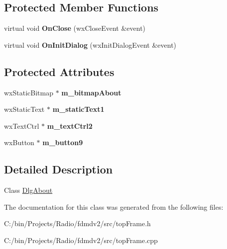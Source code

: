 \subsection*{Protected Member Functions}
\begin{DoxyCompactItemize}
\item 
\hypertarget{class_dlg_about_a3253b689497f4c6399d24c67ba78b51e}{virtual void {\bfseries On\-Close} (wx\-Close\-Event \&event)}\label{class_dlg_about_a3253b689497f4c6399d24c67ba78b51e}

\item 
\hypertarget{class_dlg_about_a442a568cf1b87a5d52a588b212f474f3}{virtual void {\bfseries On\-Init\-Dialog} (wx\-Init\-Dialog\-Event \&event)}\label{class_dlg_about_a442a568cf1b87a5d52a588b212f474f3}

\end{DoxyCompactItemize}
\subsection*{Protected Attributes}
\begin{DoxyCompactItemize}
\item 
\hypertarget{class_dlg_about_a7c406607035a55b453d7edcce9566c34}{wx\-Static\-Bitmap $\ast$ {\bfseries m\-\_\-bitmap\-About}}\label{class_dlg_about_a7c406607035a55b453d7edcce9566c34}

\item 
\hypertarget{class_dlg_about_adce6520e7385ff5ff3f032c4ed44bc14}{wx\-Static\-Text $\ast$ {\bfseries m\-\_\-static\-Text1}}\label{class_dlg_about_adce6520e7385ff5ff3f032c4ed44bc14}

\item 
\hypertarget{class_dlg_about_adc2a2d88de8cb15fcc4c9c943153df27}{wx\-Text\-Ctrl $\ast$ {\bfseries m\-\_\-text\-Ctrl2}}\label{class_dlg_about_adc2a2d88de8cb15fcc4c9c943153df27}

\item 
\hypertarget{class_dlg_about_a21c9c302df2e7f154ff410c732e6846f}{wx\-Button $\ast$ {\bfseries m\-\_\-button9}}\label{class_dlg_about_a21c9c302df2e7f154ff410c732e6846f}

\end{DoxyCompactItemize}


\subsection{Detailed Description}
Class \hyperlink{class_dlg_about}{Dlg\-About} 

The documentation for this class was generated from the following files\-:\begin{DoxyCompactItemize}
\item 
C\-:/bin/\-Projects/\-Radio/fdmdv2/src/top\-Frame.\-h\item 
C\-:/bin/\-Projects/\-Radio/fdmdv2/src/top\-Frame.\-cpp\end{DoxyCompactItemize}
